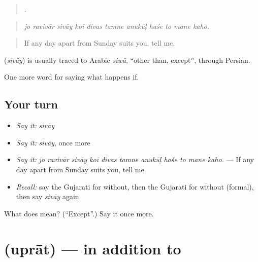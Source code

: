 \begin{quote}
          .
\end{quote}

\begin{quote}
\emph{jo ravivār sivāy koī divas tamne anukūḷ haśe to mane kaho.}
\end{quote}

\begin{quote}
If any day apart from Sunday suits you, tell me.
\end{quote}

\begin{cousinweb}
\textbf{} (\emph{sivāy}) is usually traced to Arabic \emph{siwā}, \textquotedblleft{}other than, except\textquotedblright{}, through Persian.
\end{cousinweb}

\begin{grammarlens}[title={What you've built}]
One more word for saying what happens if.
\end{grammarlens}

\subsection*{Your turn}
\begin{itemize}
\raggedright
  \item \emph{Say it:} \emph{sivāy}
  \item \emph{Say it:} \emph{sivāy}, once more
  \item \emph{Say it:} \emph{jo ravivār sivāy koī divas tamne anukūḷ haśe to mane kaho.} — If any day apart from Sunday suits you, tell me.
  \item \emph{Recall:} say the Gujarati for without, then the Gujarati for without (formal), then say \emph{sivāy} again
\end{itemize}

\begin{tcolorbox}[breakable,colback=teal!4,colframe=teal!35!black,title={Before you move on}]
What does  mean? (\textquotedblleft{}Except\textquotedblright{}.) Say it once more.
\end{tcolorbox}
\section[\texorpdfstring{\gu{ઉપરાંત} (uprā̃t)}{ઉપરાંત (uprā̃t)}]{ (uprā̃t) — in addition to}


